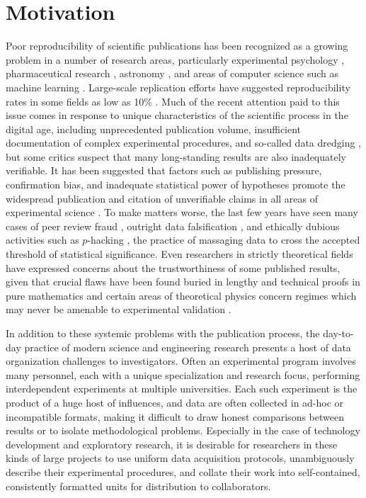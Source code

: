 \chapter{Motivation}

Poor reproducibility of scientific publications has been
recognized as a growing problem in a number of research areas,
particularly experimental psychology \cite{aac4716}, pharmaceutical research
\cite{483531a}, astronomy \cite{}, and areas of computer science such as
machine learning \cite{}. Large-scale replication efforts have
suggested reproducibility rates in some fields as low as 10\%
\cite{483531a}. Much of the recent attention paid to this issue comes in
response to unique characteristics of the scientific process in the
digital age, including unprecedented publication volume, insufficient
documentation of complex experimental procedures, and so-called data
dredging \cite{}, but some critics suspect that many long-standing
results are also inadequately verifiable. It has been
suggested that factors such as publishing pressure, confirmation bias,
and inadequate statistical power of hypotheses promote the widespread
publication and citation of unverifiable claims in all areas of
experimental science \cite{10.1371/journal.pmed.0020124}. To make
matters worse, the last few years have seen many cases of peer review
fraud \cite{}, outright data falsification \cite{}, and ethically
dubious activities such as $p$-hacking \cite{}, the practice of
massaging data to cross the accepted threshold of statistical
significance. Even researchers in strictly theoretical fields have
expressed concerns about the trustworthiness of some published
results, given that crucial flaws have been found buried in lengthy
and technical proofs in pure mathematics \cite{} and certain areas of
theoretical physics concern regimes which may never be amenable to
experimental validation \cite{}.

In addition to these systemic problems with the publication process,
the day-to-day practice of modern science and engineering research
presents a host of data organization challenges to
investigators. Often an experimental program involves many personnel,
each with a unique specialization and research focus, performing
interdependent experiments at multiple universities. Each such experiment is
the product of a huge host of influences, and data are often collected
in ad-hoc or incompatible formats, making it difficult to draw honest
comparisons between results or to isolate methodological
problems. Especially in the case of technology development and
exploratory research, it is desirable for researchers in these kinds
of large projects to use uniform data acquisition protocols,
unambiguously describe their experimental procedures, and collate
their work into self-contained, consistently formatted units for
distribution to collaborators.

